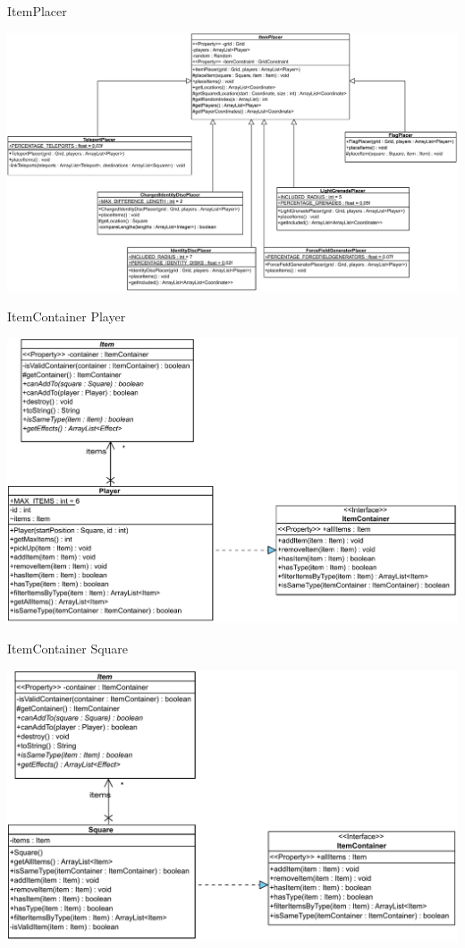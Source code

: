 \documentclass[11pt,t]{beamer}
\begin{document}
\begin{frame}{ItemPlacer}
\begin{center}
\includegraphics[width=0.95\linewidth]{images/itemplacer}
\end{center}
\end{frame}

\begin{frame}{ItemContainer}
Player
\begin{center}
\includegraphics[width=0.85\linewidth]{images/playeritemcontainer}
\end{center}
\end{frame}

\begin{frame}{ItemContainer}
Square
\begin{center}
\includegraphics[width=0.85\linewidth]{images/squareitemcontainer}
\end{center}
\end{frame}
\end{document}
